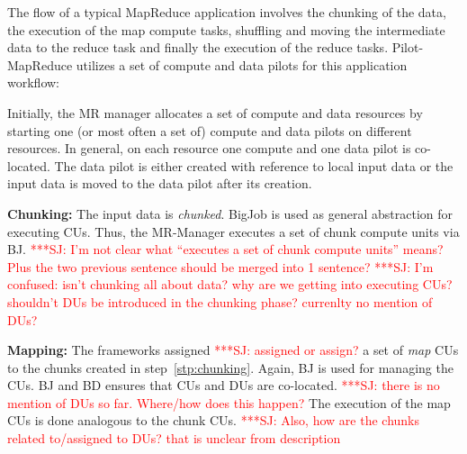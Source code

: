 \documentclass{acm_proc_article-sp}
\newcommand{\jhanote}[1]{ {\textcolor{red} { ***SJ: #1 }}}
\newcommand{\alnote}[1]{ {\textcolor{blue} { ***andreL: #1 }}}
\newcommand{\alnote}[1]{}
\newcommand{\jhanote}[1]{}
\newcommand{\pilotmapreduce}{Pilot-MapReduce\xspace}
\begin{document}
The flow of a typical MapReduce application involves the chunking of
the data, the execution of the map compute tasks, shuffling and moving
the intermediate data to the reduce task and finally the execution of
the reduce tasks.  \pilotmapreduce utilizes a set of compute and data
pilots for this application workflow: %
\begin{compactenum}[A.]
\item Initially, the MR manager allocates a set of compute and data
  resources by starting one (or most often a set of) compute and data
  pilots on different resources.  In general, on each resource one
  compute and one data pilot is co-located. The data pilot is either
  created with reference to local input data or the input data is
  moved to the data pilot after its creation.

\item \textbf{Chunking:} The input data is {\it chunked}. BigJob is
  used as general abstraction for executing CUs. Thus, the MR-Manager
  executes a set of chunk compute units via BJ.\label{stp:chunking}
  \jhanote{I'm not clear what ``executes a set of chunk compute
    units'' means? Plus the two previous sentence should be merged
    into 1 sentence?} \jhanote{I'm confused: isn't chunking all about
    data? why are we getting into executing CUs? shouldn't DUs be
    introduced in the chunking phase? currenlty no mention of DUs?}
\item \textbf{Mapping:} The frameworks assigned \jhanote{assigned or
  assign?} a set of {\it map} CUs to the chunks created in
  step~\ref{stp:chunking}. Again, BJ is used for managing the CUs. BJ
  and BD ensures that CUs and DUs are co-located. \jhanote{there is no
    mention of DUs so far. Where/how does this happen?}The execution
  of the map CUs is done analogous to the chunk CUs.  \jhanote{Also,
    how are the chunks related to/assigned to DUs? that is unclear
    from description}
	

\end{compactenum}
\end{document}
